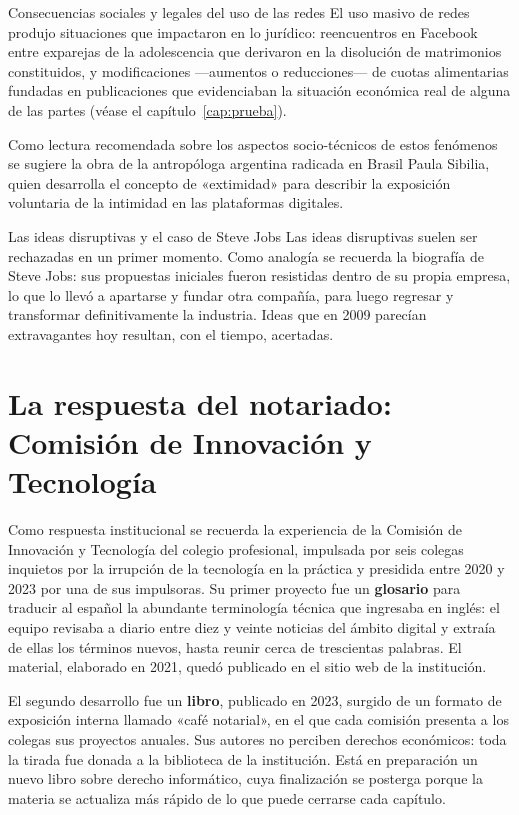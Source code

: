 \documentclass[12pt,oneside]{book}
\begin{document}
\begin{example}{Consecuencias sociales y legales del uso de las redes}
El uso masivo de redes produjo situaciones que impactaron en lo jurídico: reencuentros en Facebook entre exparejas de la adolescencia que derivaron en la disolución de matrimonios constituidos, y modificaciones ---aumentos o reducciones--- de cuotas alimentarias fundadas en publicaciones que evidenciaban la situación económica real de alguna de las partes (véase el capítulo~\ref{cap:prueba}).
\end{example}

Como lectura recomendada sobre los aspectos socio-técnicos de estos fenómenos se sugiere la obra de la antropóloga argentina radicada en Brasil Paula Sibilia, quien desarrolla el concepto de «extimidad» para describir la exposición voluntaria de la intimidad en las plataformas digitales.

\begin{example}{Las ideas disruptivas y el caso de Steve Jobs}
Las ideas disruptivas suelen ser rechazadas en un primer momento. Como analogía se recuerda la biografía de Steve Jobs: sus propuestas iniciales fueron resistidas dentro de su propia empresa, lo que lo llevó a apartarse y fundar otra compañía, para luego regresar y transformar definitivamente la industria. Ideas que en 2009 parecían extravagantes hoy resultan, con el tiempo, acertadas.
\end{example}

\section{La respuesta del notariado: Comisión de Innovación y Tecnología}

Como respuesta institucional se recuerda la experiencia de la Comisión de Innovación y Tecnología del colegio profesional, impulsada por seis colegas inquietos por la irrupción de la tecnología en la práctica y presidida entre 2020 y 2023 por una de sus impulsoras. Su primer proyecto fue un \textbf{glosario} para traducir al español la abundante terminología técnica que ingresaba en inglés: el equipo revisaba a diario entre diez y veinte noticias del ámbito digital y extraía de ellas los términos nuevos, hasta reunir cerca de trescientas palabras. El material, elaborado en 2021, quedó publicado en el sitio web de la institución.

El segundo desarrollo fue un \textbf{libro}, publicado en 2023, surgido de un formato de exposición interna llamado «café notarial», en el que cada comisión presenta a los colegas sus proyectos anuales. Sus autores no perciben derechos económicos: toda la tirada fue donada a la biblioteca de la institución. Está en preparación un nuevo libro sobre derecho informático, cuya finalización se posterga porque la materia se actualiza más rápido de lo que puede cerrarse cada capítulo.
\end{document}
